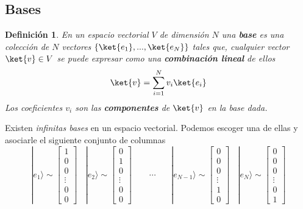\documentclass[a4paper,11pt]{book} %
\newtheorem{definicion_contador}{Definición}
\newcommand{\Definicion}[1]{
		\begin{mybox_gray2}{}
			\begin{definicion_contador}
				 #1 
			\end{definicion_contador} 
		\end{mybox_gray2}
	}
\numberwithin{equation}{chapter}
\begin{document}
		
		\subsection{Bases}
		
	\Definicion{
	En un espacio vectorial $V$ de dimensión $N$ una \textbf{base} es una colección de $N$ vectores  $\{\ket{e_1},...,\ket{e_N}\}$ tales que, cualquier vector $\ket{v}\in V$ se puede expresar como una \textbf{combinación lineal} de ellos
\begin{equation}
\ket{v} = \sum_{i=1}^N v_i \ket{e_i}
\end{equation}  
Los coeficientes $v_i$ son las \textbf{componentes} de $\ket{v}$ \textit{en la base dada}.
	}		
	
Existen \textit{infinitas bases} en un espacio vectorial. Podemos escoger una de ellas y asociarle el siguiente conjunto de columnas
	\begin{equation} \label{ec_formalismo_base_cartesina}
|e_1\rangle \sim \begin{bmatrix} 1 \\ 0 \\ 0\\ \vdots 
\\ 0 \\ 0 \end{bmatrix}~~~~
|e_2\rangle \sim \begin{bmatrix} 0 \\ 1 \\ 0\\ \vdots 
\\ 0 \\ 0 \end{bmatrix}~~~~~~~~~
\cdots ~~~~~~~~
|e_{N-1}\rangle \sim \begin{bmatrix} 0 \\ 0 \\ 0\\\vdots 
\\ 1 \\ 0 \end{bmatrix}~~~~
|e_N\rangle \sim \begin{bmatrix} 0 \\ 0 \\0\\ \vdots 
\\ 0 \\ 1 \end{bmatrix}
	\end{equation}
\end{document}
